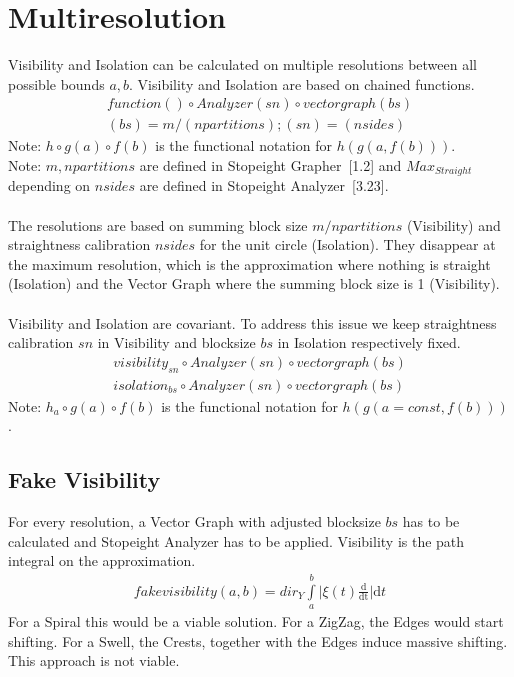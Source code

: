 \documentclass{report}
\begin{document}
\chapter{Multiresolution}
Visibility and Isolation can be calculated on multiple resolutions between all possible bounds $a,b$.
Visibility and Isolation are based on chained functions.
\begin{align*}
function() \circ Analyzer(sn) \circ vectorgraph(bs)\\
(bs)=m/(npartitions);(sn)=(nsides)
\end{align*}
Note: $h \circ g(a) \circ f(b)$ is the functional notation for $h(g(a,f(b)))$.\\
Note: $m,npartitions$ are defined in Stopeight Grapher~\cite{Grapher}[1.2] and $Max_{Straight}$ depending on $nsides$ are defined in Stopeight Analyzer~\cite{Analyzer}[3.23].\\\\
The resolutions are based on summing block size $m/npartitions$ (Visibility) and straightness calibration $nsides$ for the unit circle (Isolation). They disappear at the maximum resolution, which is the approximation where nothing is straight (Isolation) and the Vector Graph where the summing block size is 1 (Visibility).\\\\
Visibility and Isolation are covariant. To address this issue we keep straightness calibration $sn$ in Visibility and blocksize $bs$ in Isolation respectively fixed.
\begin{align}
visibility_{sn} \circ Analyzer(sn) \circ vectorgraph(bs)\\
isolation_{bs} \circ Analyzer(sn) \circ vectorgraph(bs)
\end{align}
Note: $h_{a} \circ g(a) \circ f(b)$ is the functional notation for $h(g(a=const,f(b)))$.

\section{Fake Visibility}
For every resolution, a Vector Graph with adjusted blocksize $bs$ has to be calculated and Stopeight Analyzer has to be applied.
Visibility is the path integral on the approximation.
\begin{align}
fakevisibility(a,b)= dir_{Y} \int \limits _{a}^{b} \lvert \xi(t)\frac{\mathrm{d}}{\mathrm{dt}} \rvert \mathrm{d}t
\end{align}
For a Spiral this would be a viable solution.
For a ZigZag, the Edges would start shifting.
For a Swell, the Crests, together with the Edges induce massive shifting.
This approach is not viable.
\end{document}
